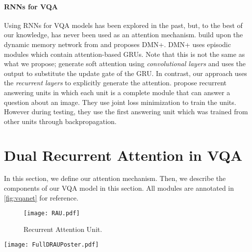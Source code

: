 \documentclass[times,twocolumn, final ,authoryear]{elsarticle}
\begin{document}
  \paragraph{\acp{RNN} for VQA}
  Using \acp{RNN} for VQA models has been explored in the past, but, to the best of our knowledge, has never been used as an attention mechanism. \citet{xiong2016a} build upon the dynamic memory network from \citet{kumar2015} and proposes DMN+. DMN+ uses episodic modules which contain attention-based GRUs. Note that this is not the same as what we propose; \citeauthor{xiong2016a} generate soft attention using \textit{convolutional layers} and uses the output to substitute the update gate of the GRU. In contrast, our approach uses the \textit{recurrent layers} to explicitly generate the attention. \citet{noh2016c} propose recurrent answering units in which each unit is a complete module that can answer a question about an image. They use joint loss minimization to train the units. However during testing, they use the first answering unit which was trained from other units through backpropagation.
  
  
  
  \section{Dual Recurrent Attention in VQA}
  In this section, we define our attention mechanism. Then, we describe the components of our VQA model in this section. All modules are annotated in \cref{fig:vqanet} for reference.
  
  \begin{figure}
  	\centering
  	\texttt{[image: RAU.pdf]}
  	\caption{Recurrent Attention Unit.}
  	\label{fig:rau}
  \end{figure}
  
  \begin{figure*}
  	\centering
  	\texttt{[image: FullDRAUPoster.pdf]}
  	\caption{The proposed network. $\oplus$ denotes concatenation.}
  	\label{fig:vqanet}
  \end{figure*}
  
\end{document}

